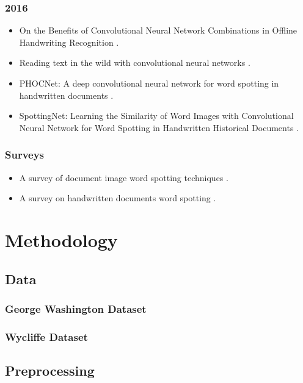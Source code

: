 \documentclass[final]{ukthesis}
\begin{document}
\subsection{2016}
\begin{itemize}
\item On the Benefits of Convolutional Neural Network Combinations in Offline Handwriting Recognition \cite{suryani2016benefits}.
\item Reading text in the wild with convolutional neural networks \cite{jaderberg2016reading}.
\item PHOCNet: A deep convolutional neural network for word spotting in handwritten documents \cite{sudholt2016phocnet}.
\item SpottingNet: Learning the Similarity of Word Images with Convolutional Neural Network for Word Spotting in Handwritten Historical Documents \cite{zhong2016spottingnet}.
\end{itemize}



\subsection{Surveys}
\begin{itemize}
\item A survey of document image word spotting techniques \cite{giotis2017survey}.

\item A survey on handwritten documents word spotting \cite{ahmed2017survey}.
\end{itemize}
\copyrightnotice




%
%
%
\chapter{Methodology}
\section{Data}
\subsection{George Washington Dataset}
\subsection{Wycliffe Dataset}

\section{Preprocessing}
\end{document}
